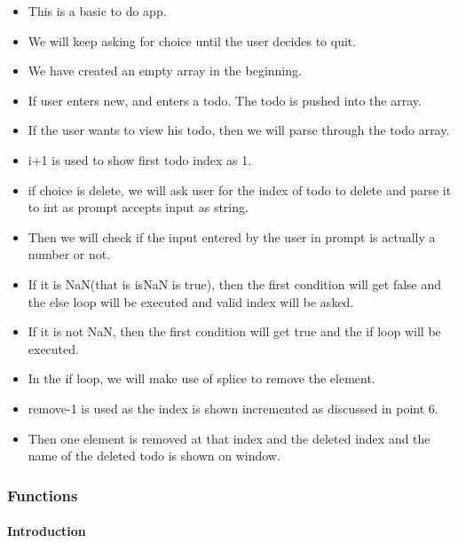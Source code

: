 \documentclass[
  paper=a4,
  ,captions=tableheading
]{scrartcl}
\providecommand{\tightlist}{%
  \setlength{\itemsep}{0pt}\setlength{\parskip}{0pt}}
\begin{document}
\begin{itemize}
\tightlist
\item
  This is a basic to do app.
\item
  We will keep asking for choice until the user decides to quit.
\item
  We have created an empty array in the beginning.
\item
  If user enters new, and enters a todo. The todo is pushed into the
  array.
\item
  If the user wants to view his todo, then we will parse through the
  todo array.
\item
  i+1 is used to show first todo index as 1.
\item
  if choice is delete, we will ask user for the index of todo to delete
  and parse it to int as prompt accepts input as string.
\item
  Then we will check if the input entered by the user in prompt is
  actually a number or not.
\item
  If it is NaN(that is isNaN is true), then the first condition will get
  false and the else loop will be executed and valid index will be
  asked.
\item
  If it is not NaN, then the first condition will get true and the if
  loop will be executed.
\item
  In the if loop, we will make use of splice to remove the element.
\item
  remove-1 is used as the index is shown incremented as discussed in
  point 6.
\item
  Then one element is removed at that index and the deleted index and
  the name of the deleted todo is shown on window.
\end{itemize}

\hypertarget{functions}{%
\subsubsection{Functions}\label{functions}}

\hypertarget{introduction-1}{%
\paragraph{Introduction}\label{introduction-1}}
\end{document}

